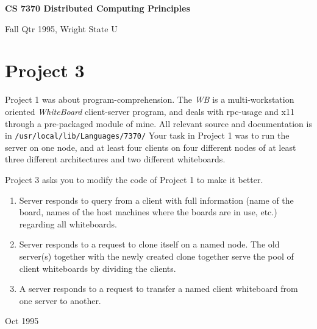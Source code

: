 \setcounter{iex}{1}
\def\itm{\medskip\noindent \theiex. ~\stepcounter{iex}}
\def\CSP{{\sc csp}}
\def\SR{{\sc sr}}
\def\ISIS{{\sc isis}}
\parindent=0pt
\parskip=0pt



{\bf CS
\Large \bf 7370 Distributed Computing Principles}\\[5pt]
\bigskip

{Fall Qtr 1995, Wright State U}

\bigskip

\section*{Project 3}

Project 1 was about program-comprehension.  The {\sl WB} is a
multi-workstation oriented {\sl WhiteBoard} client-server program, and
deals with {\sc rpc}-usage and {\sc x11} through a pre-packaged module
of mine.  All relevant source and documentation is in
\verb|/usr/local/lib/Languages/7370/| 
Your task in Project 1 was to run the server on one node, and at least
four clients on four different nodes of at least three different
architectures and two different whiteboards.


Project 3 asks you to modify the code of Project 1 to make it better.

\begin{enumerate}

\item Server responds to query from a client with full information
(name of the board, names of the host machines where the boards are in
use, etc.) regarding all whiteboards.

\item Server responds to a request to clone itself on a named node.
The old server(s) together with the newly created clone together
serve the pool of client whiteboards by dividing the clients.

\item A server responds to a request to transfer a named client
whiteboard
from one server to another.

\end{enumerate}


{\vfill\tiny Oct 1995}

